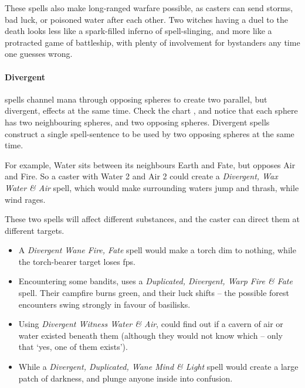 \begin{multicols}{2}
\begin{exampletext}
  These spells also make long-ranged warfare possible, as casters can send storms, bad luck, or poisoned water after each other.
  Two witches having a duel to the death looks less like a spark-filled inferno of spell-slinging, and more like a protracted game of battleship, with plenty of involvement for bystanders any time one guesses wrong.
\end{exampletext}

\begin{figure*}[t!]
  \centering
  \speltogram
  \label{speltogram}
\end{figure*}

\paragraph{Divergent}
spells channel mana through opposing \glspl{sphere} to create two parallel, but divergent, effects at the same time.
Check the chart , and notice that each \gls{sphere} has two neighbouring \glspl{sphere}, and two opposing \glspl{sphere}.
Divergent spells construct a single spell-sentence to be used by two opposing \glspl{sphere} at the same time.

For example, Water sits between its neighbours Earth and Fate, but opposes Air and Fire.
So a caster with Water 2 and Air 2 could create a \textit{Divergent, Wax Water \& Air} spell, which would make surrounding waters jump and thrash, while wind rages.

These two spells will affect different substances, and the caster can direct them at different targets.

\begin{itemize}
  \item
  A \textit{Divergent Wane Fire, Fate} spell would make a torch dim to nothing, while the torch-bearer target loses \glspl{fp}.
  \item
  Encountering some bandits,  uses a \textit{Duplicated, Divergent, Warp Fire \& Fate} spell.
  Their campfire burns green, and their luck shifts -- the possible forest encounters swing strongly in favour of \glspl{basilisk}.
  \item
  Using \textit{Divergent Witness Water \& Air},  could find out if a cavern of air or water existed beneath them (although they would not know which -- only that `yes, one of them exists').
  \item
  While a \textit{Divergent, Duplicated, Wane Mind \& Light} spell would create a large patch of darkness, and plunge anyone inside into confusion.
\end{itemize}


\end{multicols}
